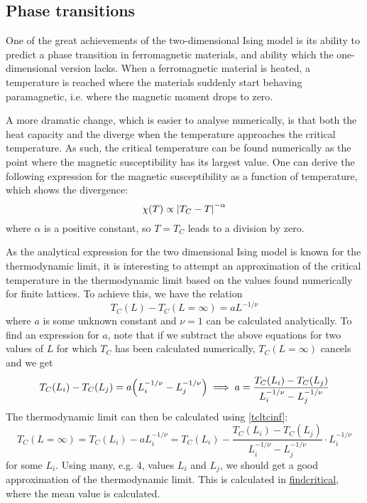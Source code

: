 \documentclass[12pt,english,a4paper]{article}
\newcommand{\program}[1]{\href{https://github.com/anjohan/Offentlig/blob/master/FYS3150/Oblig4/#1}{#1}}
\begin{document}
\subsection{Phase transitions}
One of the great achievements of the two-dimensional Ising model is its ability to predict a phase transition in ferromagnetic materials, and ability which the one-dimensional version lacks. When a ferromagnetic material is heated, a temperature is reached where the materials suddenly start behaving paramagnetic, i.e. where the magnetic moment drops to zero.

A more dramatic change, which is easier to analyse numerically, is that both the heat capacity and the diverge when the temperature approaches the critical temperature. As such, the critical temperature can be found numerically as the point where the magnetic susceptibility has its largest value. One can derive the following expression for the magnetic susceptibility as a function of temperature, which shows the divergence:
\[
\chi(T) \propto \abs{T_C-T}^{-\alpha}
\]
where \(\alpha\) is a positive constant, so \(T=T_C\) leads to a division by zero.

As the analytical expression for the two dimensional Ising model is known for the thermodynamic limit, it is interesting to attempt an approximation of the critical temperature in the thermodynamic limit based on the values found numerically for finite lattices. To achieve this, we have the relation
\[
T_C(L) - T_C(L=\infty) = aL^{-1/\nu}\label{tcltcinf}
\]
where \(a\) is some unknown constant and \(\nu=1\) can be calculated analytically. To find an expression for \(a\), note that if we subtract the above equations for two values of \(L\) for which \(T_C\) has been calculated numerically, \(T_C(L=\infty)\) cancels and we get
\[
T_C(L_i) - T_C(L_j) = a\qty(L_i^{-1/\nu} - L_j^{-1/\nu}) \implies a = \frac{T_C(L_i)-T_C(L_j)}{L_i^{-1/\nu}-L_j^{-1/\nu}}
\]
The thermodynamic limit can then be calculated using \ref{tcltcinf}:
\[
T_C(L=\infty)=T_C(L_i)-aL_i^{-1/\nu} = T_C(L_i)- \frac{T_C(L_i)-T_C(L_j)}{L_i^{-1/\nu}-L_j^{-1/\nu}}\cdot L_i^{-1/\nu}
\]
for some \(L_i\). Using many, e.g. 4, values \(L_i\) and \(L_j\), we should get a good approximation of the thermodynamic limit. This is calculated in \program{findcritical}, where the mean value is calculated.
\end{document}
